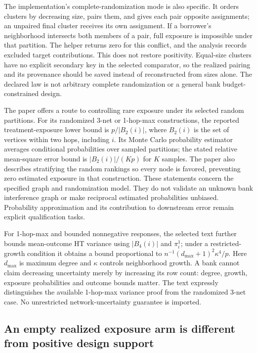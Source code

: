 The implementation's complete-randomization mode is also specific. It orders clusters by decreasing size, pairs them, and gives each pair opposite assignments; an unpaired final cluster receives its own assignment. If a borrower's neighborhood intersects both members of a pair, full exposure is impossible under that partition. The helper returns zero for this conflict, and the analysis records excluded target contributions. This does not restore positivity. Equal-size clusters have no explicit secondary key in the selected comparator, so the realized pairing and its provenance should be saved instead of reconstructed from sizes alone. The declared law is not arbitrary complete randomization or a general bank budget-constrained design.\citep{exec25_cnet_rgcr,exec25_cnet_choice}

The paper offers a route to controlling rare exposure under its selected random partitions. For its randomized 3-net or 1-hop-max constructions, the reported treatment-exposure lower bound is $p/|B_2(i)|$, where $B_2(i)$ is the set of vertices within two hops, including $i$. Its Monte Carlo probability estimator averages conditional probabilities over sampled partitions; the stated relative mean-square error bound is $|B_2(i)|/(Kp)$ for $K$ samples. The paper also describes stratifying the random rankings so every node is favored, preventing zero estimated exposure in that construction. These statements concern the specified graph and randomization model. They do not validate an unknown bank interference graph or make reciprocal estimated probabilities unbiased. Probability approximation and its contribution to downstream error remain explicit qualification tasks.\citep{exec25_cnet_paper,exec25_cnet_choice}

For 1-hop-max and bounded nonnegative responses, the selected text further bounds mean-outcome HT variance using $|B_4(i)|$ and $\pi_i^1$; under a restricted-growth condition it obtains a bound proportional to $n^{-1}(d_{\max}+1)^2\kappa^4/p$. Here $d_{\max}$ is maximum degree and $\kappa$ controls neighborhood growth. A bank cannot claim decreasing uncertainty merely by increasing its row count: degree, growth, exposure probabilities and outcome bounds matter. The text expressly distinguishes the available 1-hop-max variance proof from the randomized 3-net case. No unrestricted network-uncertainty guarantee is imported.\citep{exec25_cnet_paper}

\subsection{An empty realized exposure arm is different from positive design support}

